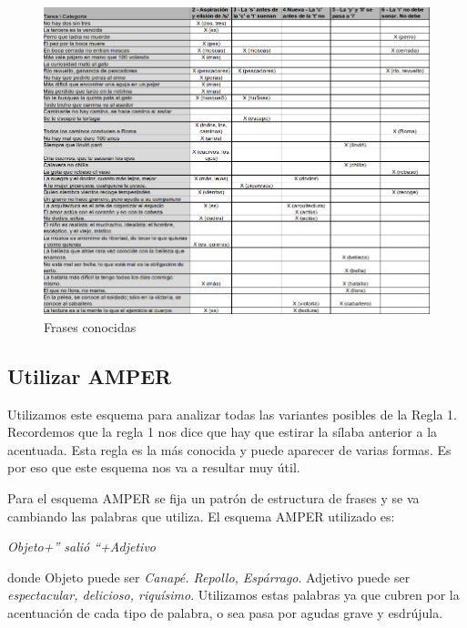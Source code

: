 \documentclass[11pt,a4paper,twoside]{tesis}
\begin{document}
\begin{figure}[h!]
    \centerline{\includegraphics[width=1\textwidth]{frases_inf} }
    \caption{Frases conocidas}
    \label{fig22}
\end{figure}

\subsection{Utilizar AMPER}


Utilizamos este esquema para analizar todas las variantes posibles de la Regla 1. Recordemos que la regla 1 nos dice que hay que estirar la sílaba anterior a la acentuada. Esta regla es la más conocida y puede aparecer de varias formas. Es por eso que este esquema nos va a resultar muy útil. 

Para el esquema AMPER se fija un patrón de estructura de frases y se va cambiando las palabras que utiliza. 
El esquema AMPER utilizado es: 
\begin{center}
\textit{Objeto+” salió “+Adjetivo} 
\end{center}
donde Objeto puede ser \textit{Canapé. Repollo, Espárrago}. Adjetivo puede ser \textit{espectacular, delicioso, riquísimo}. Utilizamos estas palabras ya que cubren por la acentuación de cada tipo de palabra, o sea pasa por agudas grave y esdrújula. 
\end{document}
